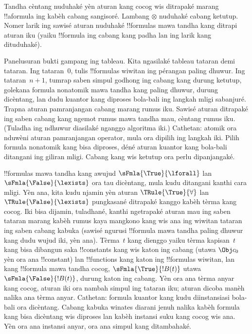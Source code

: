 \documentclass[../../../include/open-logic-section]{subfiles}
\begin{document}
Tandha cèntang nuduhaké yèn aturan kang cocog wis
ditrapaké marang !!a{formula} ing kabèh cabang
sangisoré. Lambang $\otimes$ nuduhaké cabang ketutup.
Nomer larik ing sawisé aturan nuduhaké !!{formula}s
mawa tandha kang ditrapi aturan iku (yaiku
!!{formula} ing cabang kang padha lan ing larik
kang dituduhaké).

Panelusuran bukti gampang ing tableau. Kita ngasilaké
tableau tataran demi tataran. Ing tataran~$0$,
tulis !!{formula}s wiwitan ing pérangan paling dhuwur.
Ing tataran~$n+1$, tumrap saben simpul godhong ing cabang
kang durung ketutup, golekana formula nonatomik mawa tandha
kang paling dhuwur, durung dicèntang, lan dudu kuantor
kang diproses bola-bali ing langkah mligi sabanjuré. Trapna aturan pamranjangan cabang
marang rumus iku. Sawisé aturan ditrapaké ing saben
cabang kang ngemot rumus mawa tandha mau, cèntang
rumus iku. (Tuladha ing ndhuwur diasilaké nganggo
algoritma iki.)
Cathetan: atomik ora nduwèni aturan pamranjangan operator, mula ora dipilih ing langkah iki. Pilih formula nonatomik kang bisa diproses, déné aturan kuantor kang bola-bali ditangani ing giliran mligi. Cabang kang wis ketutup ora perlu dipanjangaké.

!!{formula}s mawa tandha kang awujud
$\sFmla{\True}{\lforall}$ lan
$\sFmla{\False}{\lexists}$ ora tau dicèntang, mula
kudu ditangani kanthi cara mligi. Yèn ana, kita
kudu njamin yèn aturan $\TRule{\True}{\forall}$
lan $\TRule{\False}{\lexists}$ pungkasané ditrapaké
kanggo kabèh tèrma kang cocog. Iki bisa dijamin,
tuladhané, kanthi ngetrapaké aturan mau ing saben
tataran marang kabèh rumus kaya mangkono kang wis ana ing wiwitan
tataran ing saben cabang kabuka (sawisé ngurusi !!{formula}
mawa tandha paling dhuwur kang dudu wujud iki, yèn ana). Tèrma~$t$
kang dienggo yaiku tèrma kapisan~$t$ kang bisa
dibangun saka !!{constant}s kang wis katon ing
cabang (utawa $\Obj c_0$ yèn ora ana !!{constant})
lan !!{function}s kang katon ing !!{formula}s
wiwitan, lan kang !!{formula} mawa tandha cocog,
$\sFmla{\True}{!B(t)}$ utawa~$\sFmla{\False}{!B(t)}$,
durung katon ing cabang. Yèn ora ana tèrma anyar
kang cocog, aturan iki ora nambah simpul ing tataran
iku; aturan dicoba manèh nalika ana tèrma anyar.
Cathetan: formula kuantor kang kudu diinstansiasi bola-bali ora dicèntang. Cabang kabuka winates diarani jenuh nalika kabèh formula kang bisa dicèntang wis diproses lan kabèh instansi suku kang cocog wis ana. Yèn ora ana instansi anyar, ora ana simpul kang ditambahaké.
\end{document}
